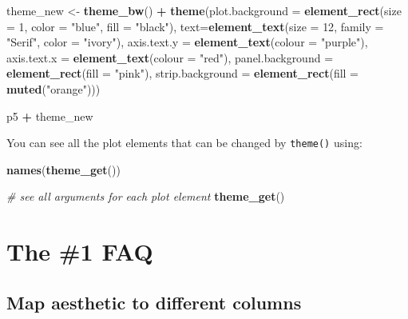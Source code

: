 \documentclass[]{book}
\newenvironment{Shaded}{\begin{snugshade}}{\end{snugshade}}
\newcommand{\KeywordTok}[1]{\textcolor[rgb]{0.13,0.29,0.53}{\textbf{#1}}}
\newcommand{\DataTypeTok}[1]{\textcolor[rgb]{0.13,0.29,0.53}{#1}}
\newcommand{\DecValTok}[1]{\textcolor[rgb]{0.00,0.00,0.81}{#1}}
\newcommand{\StringTok}[1]{\textcolor[rgb]{0.31,0.60,0.02}{#1}}
\newcommand{\CommentTok}[1]{\textcolor[rgb]{0.56,0.35,0.01}{\textit{#1}}}
\newcommand{\OperatorTok}[1]{\textcolor[rgb]{0.81,0.36,0.00}{\textbf{#1}}}
\newcommand{\NormalTok}[1]{#1}
\begin{document}
\begin{Shaded}
\begin{Highlighting}[]
\NormalTok{theme_new <-}\StringTok{ }\KeywordTok{theme_bw}\NormalTok{() }\OperatorTok{+}
\StringTok{  }\KeywordTok{theme}\NormalTok{(}\DataTypeTok{plot.background =} \KeywordTok{element_rect}\NormalTok{(}\DataTypeTok{size =} \DecValTok{1}\NormalTok{, }\DataTypeTok{color =} \StringTok{"blue"}\NormalTok{, }\DataTypeTok{fill =} \StringTok{"black"}\NormalTok{),}
        \DataTypeTok{text=}\KeywordTok{element_text}\NormalTok{(}\DataTypeTok{size =} \DecValTok{12}\NormalTok{, }\DataTypeTok{family =} \StringTok{"Serif"}\NormalTok{, }\DataTypeTok{color =} \StringTok{"ivory"}\NormalTok{),}
        \DataTypeTok{axis.text.y =} \KeywordTok{element_text}\NormalTok{(}\DataTypeTok{colour =} \StringTok{"purple"}\NormalTok{),}
        \DataTypeTok{axis.text.x =} \KeywordTok{element_text}\NormalTok{(}\DataTypeTok{colour =} \StringTok{"red"}\NormalTok{),}
        \DataTypeTok{panel.background =} \KeywordTok{element_rect}\NormalTok{(}\DataTypeTok{fill =} \StringTok{"pink"}\NormalTok{),}
        \DataTypeTok{strip.background =} \KeywordTok{element_rect}\NormalTok{(}\DataTypeTok{fill =} \KeywordTok{muted}\NormalTok{(}\StringTok{"orange"}\NormalTok{)))}

\NormalTok{p5 }\OperatorTok{+}\StringTok{ }\NormalTok{theme_new}
\end{Highlighting}
\end{Shaded}

You can see all the plot elements that can be changed by
\texttt{theme()} using:

\begin{Shaded}
\begin{Highlighting}[]
\KeywordTok{names}\NormalTok{(}\KeywordTok{theme_get}\NormalTok{())}

\CommentTok{# see all arguments for each plot element}
\KeywordTok{theme_get}\NormalTok{()}
\end{Highlighting}
\end{Shaded}

\section{The \#1 FAQ}\label{the-1-faq}

\subsection{Map aesthetic to different
columns}\label{map-aesthetic-to-different-columns}
\end{document}
